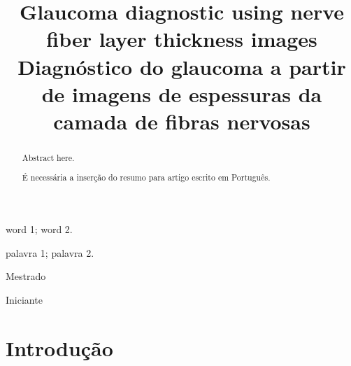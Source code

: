 \documentclass[conference]{IEEEtran}
\begin{document}
\title{Glaucoma diagnostic using nerve fiber layer thickness images \\ Diagnóstico do glaucoma a partir de imagens de espessuras da camada de fibras nervosas}


\author{
}


\maketitle

\thispagestyle{fancy}

\renewcommand{\abstractname}{Abstract}
\begin{abstract}
Abstract here.
\end{abstract}

\renewcommand\IEEEkeywordsname{Keywords}
\begin{IEEEkeywords}
\label{Keywords}
word 1; word 2.
\end{IEEEkeywords}

\renewcommand{\abstractname}{Resumo}
\begin{abstract}
\label{Resumo}
\'E necess\'aria a inser\c{c}\~{a}o do resumo para artigo escrito em Portugu\^{e}s.
\end{abstract}

\renewcommand\IEEEkeywordsname{Palavras-chave}
\begin{IEEEkeywords}
\label{Palavras-chave}
palavra 1; palavra 2.
\end{IEEEkeywords}

\renewcommand\IEEEkeywordsname{Classifica\c{c}\~{a}o}
\begin{IEEEkeywords}
	\label{classificacao}
	Mestrado
\end{IEEEkeywords}

\renewcommand\IEEEkeywordsname{Categoria}
\begin{IEEEkeywords}
	\label{Categoria}
	Iniciante 
\end{IEEEkeywords}

\IEEEpeerreviewmaketitle


\section{Introdução}

\end{document}

